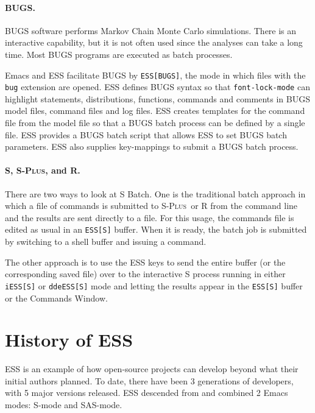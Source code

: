 \documentclass{article}
\newcommand*{\Splus}{\textsc{S-Plus}}
\newcommand{\stexttt}[1]{{\small\texttt{#1}}}
\begin{document}
\paragraph{BUGS.}
\label{sec:bugs-batch}
  
BUGS software performs Markov Chain Monte Carlo simulations.  There is
an interactive capability, but it is not often used since the analyses
can take a long time. %
Most BUGS programs are executed as batch processes.

Emacs and ESS facilitate BUGS by \stexttt{ESS[BUGS]}, the mode in which 
files with the \stexttt{bug} extension are opened.  ESS defines BUGS 
syntax so that
\stexttt{font-lock-mode} can highlight statements, distributions,
functions, commands and comments in BUGS model files, command files
and log files.  ESS creates templates for the command file from the
model file so that a BUGS batch process can be defined by a single
file.  ESS provides a BUGS batch script that allows ESS to set BUGS
batch parameters.  ESS also supplies key-mappings to submit a BUGS
batch process.

\paragraph{S, \Splus, and R.}
There are two ways to look at S Batch.  One is the traditional batch
approach in which a file of commands is submitted to \Splus\ or R from
the command line and the results are sent directly to a file.  For
this usage, the commands file is edited as usual in an \stexttt{ESS[S]}
buffer.  When it is ready, the batch job is submitted by switching to a
shell buffer and issuing a command.

The other approach is to use the ESS keys to send the entire buffer
(or the corresponding saved file) over to the interactive S process
running in either \stexttt{iESS[S]} or \stexttt{ddeESS[S]} mode and
letting the results appear in the \stexttt{ESS[S]} buffer or the
Commands Window.

\section{History of ESS}
\label{sec:ESS:history}

ESS is an example of how open-source projects can develop beyond what
their initial authors planned.  To date, there have been 3 generations
of developers, with 5 major versions released.  ESS descended from and combined
2 Emacs modes: S-mode and SAS-mode.
\end{document}
